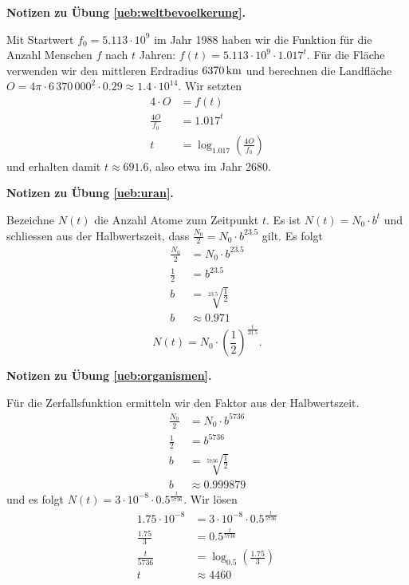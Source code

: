 \documentclass[%
11pt,%
twoside,%
titlepage,%
german,%
headsepline%
]{scrartcl}
\newcommand{\concatueb}[1]{ueb:#1}%
\newcommand{\concatlsg}[1]{lsg:#1}%
\newenvironment{lsg}[1]{%
    \par\noindent\textbf{Notizen zu Übung \ref{\concatueb{#1}}.}%
    \label{\concatlsg{#1}}
}{%
    \par%
}
\begin{document}
\begin{lsg}{weltbevoelkerung}
    Mit Startwert $f_0=5.113\cdot10^9$ im Jahr 1988 haben wir die Funktion für die Anzahl Menschen $f$ nach $t$ Jahren: $f(t)=5.113\cdot10^9\cdot1.017^t$. Für die Fläche verwenden wir den mittleren Erdradius $\unit[6370]{km}$ und berechnen die Landfläche $O=4\pi\cdot6\,370\,000^2\cdot 0.29\approx1.4\cdot10^{14}$. Wir setzten
    \begin{align*}
        4\cdot O &= f(t)\\
        \frac{4O}{f_0} &= 1.017^t\\
        t &= \log_1.017(\frac{4O}{f_0})
    \end{align*}
    und erhalten damit $t\approx691.6$, also etwa im Jahr 2680.
\end{lsg}
\begin{lsg}{uran}
    Bezeichne $N(t)$ die Anzahl Atome zum Zeitpunkt $t$. Es ist $N(t)=N_0\cdot b^t$ und schliessen aus der Halbwertszeit, dass $\frac{N_0}{2}=N_0\cdot b^{23.5}$ gilt. Es folgt
    \begin{align*}
        \frac{N_0}{2} &= N_0\cdot b^{23.5}\tag{$\div N_0$}\\
        \frac{1}{2} &= b^{23.5}\\
        b &= \sqrt[23.5]{\frac{1}{2}}\\
        b &\approx 0.971
    \end{align*}
    $$N(t)=N_0\cdot(\frac{1}{2})^\frac{t}{23.5}.$$
\end{lsg}
\begin{lsg}{organismen}
    Für die Zerfallsfunktion ermitteln wir den Faktor aus der Halbwertszeit.
    \begin{align*}
        \frac{N_0}{2} &= N_0\cdot b^{5736}\tag{$\div N_0$}\\
        \frac{1}{2} &= b^{5736}\\
        b &= \sqrt[5736]{\frac{1}{2}}\\
        b &\approx 0.999879
    \end{align*}
    und es folgt $N(t)=3\cdot10^{-8}\cdot 0.5^\frac{t}{5736}$. Wir lösen
    \begin{align*}
        1.75\cdot10^{-8} &= 3\cdot10^{-8}\cdot 0.5^\frac{t}{5736}\\
        \frac{1.75}{3} &= 0.5^\frac{t}{5736}\\
        \frac{t}{5736} &= \log_{0.5}(\frac{1.75}{3})\\
        t &\approx 4460
    \end{align*}
\end{lsg}
\end{document}
